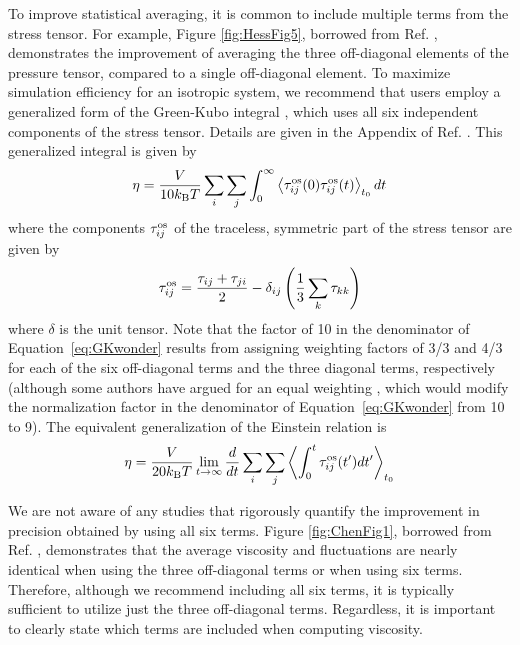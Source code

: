 \documentclass[9pt,bestpractices]{livecoms}
\begin{document}
To improve statistical averaging, it is common to include multiple terms from the stress tensor. For example, Figure \ref{fig:HessFig5}, borrowed from Ref. \cite{Hess2002}, demonstrates the improvement of averaging the three off-diagonal elements of the pressure tensor, compared to a single off-diagonal element. To maximize simulation efficiency for an isotropic system, we recommend that users employ a generalized form of the Green-Kubo integral \citep{Evans:90, Daivis:1994}, which uses all six independent components of the stress tensor. Details are given in the Appendix of Ref. \cite{Daivis:1994}. This generalized integral is given by
\begin{equation}
  \eta = \frac{V}{10 k_{\rm B} T} \sum_i \sum_j \int_0^\infty \left\langle \tau_{ij}^{\rm os}(0)\tau_{ij}^{\rm os}(t) \right\rangle_{t_0} dt
  \label{eq:GKwonder}
\end{equation}
where the components $\tau_{ij}^{\rm os}$ of the traceless, symmetric part of the stress tensor are given by
\begin{equation}
  \tau_{ij}^{\rm os} = \frac{\tau_{ij}+\tau_{ji}}{2} - \delta_{ij} \left( \frac{1}{3} \sum_k \tau_{kk} \right)
  \label{eq:Pwonder}
\end{equation}
where $\delta$ is the unit tensor. Note that the factor of 10 in the denominator of Equation~\ref{eq:GKwonder} results from assigning weighting factors of 3/3 and 4/3 for each of the six off-diagonal terms and the three diagonal terms, respectively \cite{Liu2012,Borodin2009,Mondello1997} (although some authors have argued for an equal weighting \cite{Chen2009}, which would modify the normalization factor in the denominator of Equation~\ref{eq:GKwonder} from 10 to 9).
The equivalent generalization of the Einstein relation is
\begin{equation}
  \eta = \frac{V}{20 k_{\rm B} T} \lim_{t\to\infty} \frac{d}{dt} \sum_i \sum_j \left\langle \int_0^t \tau_{ij}^{\rm os}(t') dt' \right\rangle_{t_0}
  \label{eq:Einwonder}
\end{equation}

We are not aware of any studies that rigorously quantify the improvement in precision obtained by using all six terms. Figure \ref{fig:ChenFig1}, borrowed from Ref. \cite{Chen2009}, demonstrates that the average viscosity and fluctuations are nearly identical when using the three off-diagonal terms or when using six terms. Therefore, although we recommend including all six terms, it is typically sufficient to utilize just the three off-diagonal terms. Regardless, it is important to clearly state which terms are included when computing viscosity.
\end{document}
